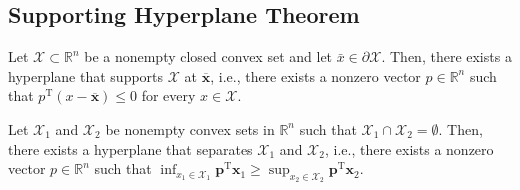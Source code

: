 \documentclass[english]{latex4ei_sheet}
\begin{document}
\begin{sectionbox}
\subsection{Supporting Hyperplane Theorem}
\begin{emphbox}
Let $\mathcal{X} \subset \mathbb{R}^{n}$ be a nonempty closed convex set and let $\bar{x} \in \partial \mathcal{X}$. Then, there exists a hyperplane that supports $\mathcal{X}$ at $\overline{\boldsymbol{x}}$, i.e., there exists a nonzero vector $p \in \mathbb{R}^{n}$ such that $p^{\mathrm{T}}(x-\overline{\boldsymbol{x}}) \leq 0$ for every $x \in \mathcal{X}$.
\end{emphbox}


Let $\mathcal{X}_{1}$ and $\mathcal{X}_{2}$ be nonempty convex sets in $\mathbb{R}^{n}$ such that $\mathcal{X}_{1} \cap \mathcal{X}_{2}=\emptyset .$ Then, there exists a hyperplane that separates $\mathcal{X}_{1}$ and $\mathcal{X}_{2}$, i.e., there exists a nonzero vector $p \in \mathbb{R}^{n}$ such that $\inf _{x_{1} \in \mathcal{X}_{1}} \boldsymbol{p}^{\mathrm{T}} \boldsymbol{x}_{1} \geq \sup _{x_{2} \in \mathcal{X}_{2}} \boldsymbol{p}^{\mathrm{T}} \boldsymbol{x}_{2} .$
\end{sectionbox}
\end{document}
